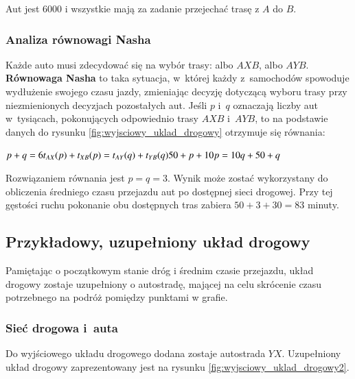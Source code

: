 \documentclass[twoside,12pt]{report}
\begin{document}
Aut jest 6000 i wszystkie mają za zadanie przejechać trasę z $A$ do $B$.


\subsubsection{Analiza równowagi Nasha}

Każde auto musi zdecydować się na wybór trasy: albo $AXB$, albo $AYB$. \textbf{Równowaga Nasha} to taka sytuacja, w~której każdy z~samochodów spowoduje wydłużenie swojego czasu jazdy, zmieniając decyzję dotyczącą wyboru trasy przy niezmienionych decyzjach pozostałych aut. Jeśli $p$ i~$q$ oznaczają liczby aut w~tysiącach, pokonujących odpowiednio trasy $AXB$ i~$AYB$, to na podstawie danych do rysunku \ref{fig:wyjsciowy_uklad_drogowy} otrzymuje się równania:

\begin{center}
\begin{math}\label{eq:nash1}
p+q = 6 \newline
t_{AX}(p)+t_{XB}(p) = t_{AY}(q) + t_{YB}(q) \newline
50+p+10p = 10q+50+q \newline
\end{math}
\end{center}

Rozwiązaniem równania jest $p=q=3$. Wynik może zostać wykorzystany do obliczenia średniego czasu przejazdu aut po dostępnej sieci drogowej. Przy tej gęstości ruchu pokonanie obu dostępnych tras zabiera $50+3+30=83$ minuty.

\subsection{Przykładowy, uzupełniony układ drogowy}

Pamiętając o początkowym stanie dróg i średnim czasie przejazdu, układ drogowy zostaje uzupełniony o autostradę, mającej na celu skrócenie czasu potrzebnego na podróż pomiędzy punktami w grafie.

\subsubsection{Sieć drogowa i~auta}
Do wyjściowego układu drogowego dodana zostaje autostrada $YX$. Uzupełniony układ drogowy zaprezentowany jest na rysunku \ref{fig:wyjsciowy_uklad_drogowy2}.
\end{document}
